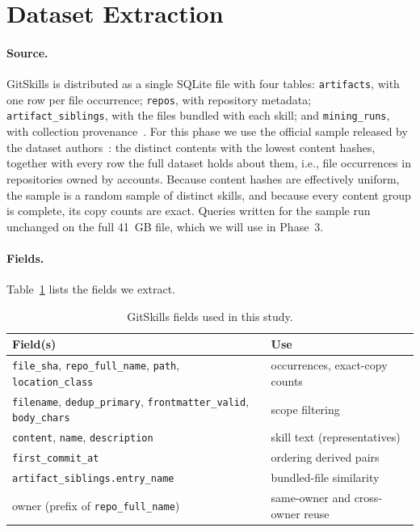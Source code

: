 \section{Dataset Extraction}
\label{sec:dataset}

\paragraph{Source.} GitSkills is distributed as a single SQLite file with four tables:
\texttt{artifacts}, with one row per file occurrence; \texttt{repos}, with repository
metadata; \texttt{artifact\_\allowbreak siblings}, with the files bundled with each skill; and
\texttt{mining\_runs}, with collection provenance~\cite{destefanis2027gitskills}. For this phase we use the official
sample released by the dataset authors~\cite{gitskills_sample}: the \ResContentsTotal{}
distinct contents with the lowest content hashes, together with every row the full dataset
holds about them, i.e., \ResOccTotal{} file occurrences in \ResReposTotal{} repositories owned
by \ResOwnersTotal{} accounts. Because content hashes are effectively uniform, the sample is a
random sample of distinct skills, and because every content group is complete, its copy counts
are exact. Queries written for the sample run unchanged on the full 41~GB file, which we will
use in Phase~3.

\paragraph{Fields.} Table~\ref{tab:fields} lists the fields we extract.

\begin{table}[t]
\caption{GitSkills fields used in this study.}
\label{tab:fields}
\small
\begin{tabular}{>{\raggedright\arraybackslash}p{}>{\raggedright\arraybackslash}p{}}
\toprule
Field(s) & Use \\
\midrule
\texttt{file\_sha}, \texttt{repo\_full\_name}, \texttt{path}, \texttt{location\_class} & occurrences, exact-copy counts \\
\texttt{filename}, \texttt{dedup\_primary}, \texttt{frontmatter\_valid}, \texttt{body\_chars} & scope filtering \\
\texttt{content}, \texttt{name}, \texttt{description} & skill text (representatives) \\
\texttt{first\_commit\_at} & ordering derived pairs \\
\texttt{artifact\_siblings.entry\_name} & bundled-file similarity \\
owner (prefix of \texttt{repo\_full\_name}) & same-owner and cross-owner reuse \\
\bottomrule
\end{tabular}
\end{table}

